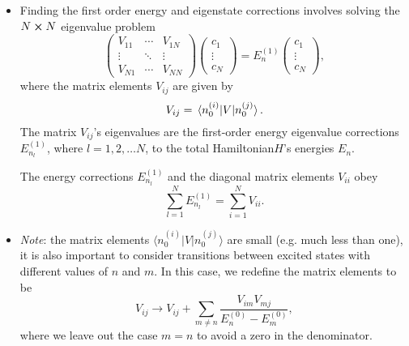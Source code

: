 \documentclass[11pt, a4paper]{article}
\newcommand{\Ham}{Hamiltonian\xspace}
\newcommand{\bmel}[3]{\big \langle {#1} \big | {#2} \big | {#3} \big \rangle}  %
\begin{document}
\begin{itemize}
    \item Finding the first order energy and eigenstate corrections involves solving the $ N \cross N $ eigenvalue problem
    \begin{equation*}
        \begin{pmatrix}
            V_{11} & \cdots & V_{1N}\\
            \vdots & \ddots & \vdots\\
            V_{N1} & \cdots & V_{NN}
        \end{pmatrix}
        \begin{pmatrix}
            c_{1}\\
            \vdots\\
            c_{N}
        \end{pmatrix}
        = E_{n}^{(1)}
        \begin{pmatrix}
            c_{1}\\
            \vdots\\
            c_{N}
        \end{pmatrix},
    \end{equation*}
    where the matrix elements $ V_{ij} $ are given by
    \begin{equation*}
        V_{ij} = \mel*{n_{0}^{(i)}}{V}{n_{0}^{(j)}}.
    \end{equation*}
    The matrix $ V_{ij} $'s eigenvalues are the first-order energy eigenvalue corrections $ E_{n_{l}}^{(1)} $, where $ l = 1, 2, \ldots N $, to the total \Ham $ H $'s energies $ E_{n} $.

    The energy corrections $ E_{n_{l}}^{(1)} $ and the diagonal matrix elements $ V_{ii} $ obey
    \begin{equation*}
        \sum_{l = 1}^{N} E_{n_{l}}^{(1)} = \sum_{i = 1}^{N}V_{ii}.
    \end{equation*}
    
    \item \textit{Note}: the matrix elements $ \bmel{n_{0}^{(i)}}{V}{n_{0}^{(j)}} $ are small (e.g. much less than one), it is also important to consider transitions between excited states with different values of $ n $ and $ m $. In this case, we redefine the matrix elements to be
    \begin{equation*}
        V_{ij} \to V_{ij} + \sum_{m\neq n} \frac{V_{im}V_{mj}}{E_{n}^{(0)} - E_{m}^{(0)}},
    \end{equation*}
    where we leave out the case $ m = n $ to avoid a zero in the denominator.
\end{itemize}
\end{document}
